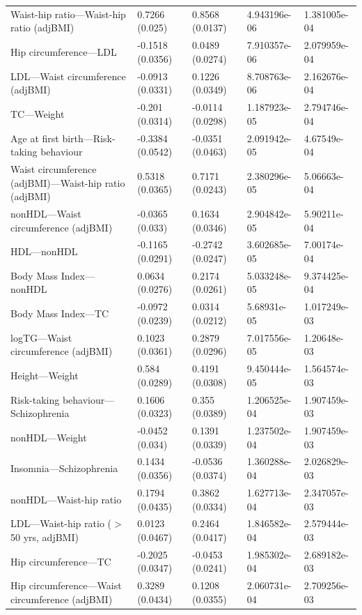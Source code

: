 \documentclass{article}\usepackage[]{graphicx}\usepackage[dvipsnames]{xcolor}
\begin{document}
\begin{longtable}{p{6cm}|p{1.5cm}|p{1.5cm}|p{1.5cm}}
  Waist-hip ratio---Waist-hip ratio (adjBMI) & 0.7266 (0.025) & 0.8568 (0.0137) & 4.943196e-06 & 1.381005e-04 \\ 
  Hip circumference---LDL & -0.1518 (0.0356) & 0.0489 (0.0274) & 7.910357e-06 & 2.079959e-04 \\ 
  LDL---Waist circumference (adjBMI) & -0.0913 (0.0331) & 0.1226 (0.0349) & 8.708763e-06 & 2.162676e-04 \\ 
  TC---Weight & -0.201 (0.0314) & -0.0114 (0.0298) & 1.187923e-05 & 2.794746e-04 \\ 
  Age at first birth---Risk-taking behaviour & -0.3384 (0.0542) & -0.0351 (0.0463) & 2.091942e-05 & 4.67549e-04 \\ 
  Waist circumference (adjBMI)---Waist-hip ratio (adjBMI) & 0.5318 (0.0365) & 0.7171 (0.0243) & 2.380296e-05 & 5.06663e-04 \\ 
  nonHDL---Waist circumference (adjBMI) & -0.0365 (0.033) & 0.1634 (0.0346) & 2.904842e-05 & 5.90211e-04 \\ 
  HDL---nonHDL & -0.1165 (0.0291) & -0.2742 (0.0247) & 3.602685e-05 & 7.00174e-04 \\ 
  Body Mass Index---nonHDL & 0.0634 (0.0276) & 0.2174 (0.0261) & 5.033248e-05 & 9.374425e-04 \\ 
  Body Mass Index---TC & -0.0972 (0.0239) & 0.0314 (0.0212) & 5.68931e-05 & 1.017249e-03 \\ 
  logTG---Waist circumference (adjBMI) & 0.1023 (0.0361) & 0.2879 (0.0296) & 7.017556e-05 & 1.20648e-03 \\ 
  Height---Weight & 0.584 (0.0289) & 0.4191 (0.0308) & 9.450444e-05 & 1.564574e-03 \\ 
  Risk-taking behaviour---Schizophrenia & 0.1606 (0.0323) & 0.355 (0.0389) & 1.206525e-04 & 1.907459e-03 \\ 
  nonHDL---Weight & -0.0452 (0.034) & 0.1391 (0.0339) & 1.237502e-04 & 1.907459e-03 \\ 
  Insomnia---Schizophrenia & 0.1434 (0.0356) & -0.0536 (0.0374) & 1.360288e-04 & 2.026829e-03 \\ 
  nonHDL---Waist-hip ratio & 0.1794 (0.0435) & 0.3862 (0.0334) & 1.627713e-04 & 2.347057e-03 \\ 
  LDL---Waist-hip ratio ($>$ 50 yrs, adjBMI) & 0.0123 (0.0467) & 0.2464 (0.0417) & 1.846582e-04 & 2.579444e-03 \\ 
  Hip circumference---TC & -0.2025 (0.0347) & -0.0453 (0.0241) & 1.985302e-04 & 2.689182e-03 \\ 
  Hip circumference---Waist circumference (adjBMI) & 0.3289 (0.0434) & 0.1208 (0.0355) & 2.060731e-04 & 2.709256e-03 \\ 

\end{longtable}
\end{document}
